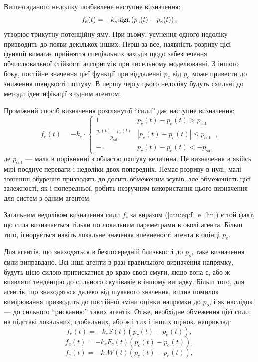 Вищезгаданого недоліку позбавлене наступне визначення:
%
\begin{equation}
  f_e(t) = - k_e \operatorname*{sign} \left( p_c(t) - p_e(t) \right) ,
  \label{atu:eq:f_e_sign}
\end{equation}
%
утворює трикутну потенційну яму. При цьому, усунення одного
недоліку призводить до появи декількох інших. Перш за все,
наявність розриву цієї функції вимагає прийняття спеціальних
заходів щодо забезпечення обчислювальної стійкості алгоритмів
при чисельному моделюванні. З іншого боку, постійне значення
цієї функції при віддаленні
$ p_c $ від
$ p_e $ може привести до зниження швидкості пошуку. В першу чергу
цього недоліку будуть схильні до методи ідентифікації з одним
агентом.

Проміжний спосіб визначення розглянутої ``сили'' дає наступне
визначення:
%
\begin{equation}
  f_e(t)
  = - k_e \cdot
  \begin{cases}
    1 &  p_c(t) - p_e(t)  > p_\mathrm{sat}
    \\
    \frac{p_c(t)-p_e(t)}{p_\mathrm{sat}} & | p_c(t)-p_e(t)| \le p_\mathrm{sat}
    \\
    -1 &  p_c(t) - p_e(t)  < -p_\mathrm{sat}
  \end{cases},
  \label{atu:eq:f_e_sat}
\end{equation}
%
де  $p_\mathrm{sat}$ ---
мала в порівнянні з областю пошуку величина. Це визначення в
якійсь мірі поєднує переваги і недоліки двох попередніх. Немає
розриву в нулі, малі зовнішні обурення призводять до досить
обмеженим зсувів, але обмеженість цієї залежності, як і
попередньої, робить незручним використання цього визначення
для систем з одним агентом.

Загальним недоліком визначення сили $f_e$ за виразом (\ref{atu:eq:f_e_lin})
є той факт, що сила визначається тільки по локальним параметрами в околі
агента. Більш того, ігнорується навіть локальне значення впевненості агента в
оцінці $p_e$.

Для агентів, що знаходяться в безпосередній близькості до
$ p_o $, таке визначення сили виправдано. Всі інші агенти в разі
правильного визначення напрямку, будуть цією силою притискатися
до краю своєї смуги, якщо вона є, або ж виявляти тенденцію до
сильного скучіваніе в іншому випадку. Більш того, для агентів,
що знаходяться далеко від шуканого значення, вплив помилок
вимірювання призводить до постійної зміни оцінки напрямки до
$ p_o $, і як наслідок --- до сильного ``рисканню'' таких агентів. Отже,
необхідне обмеження цієї сили, на підставі локальних,
глобальних, або ж і тих і інших оцінок. наприклад:
%
\begin{equation}
  f_e(t) = - k_e S(t) \left( p_c(t) - p_e(t) \right) ,
  \label{atu:eq:f_e_lin_S}
\end{equation}
%
\begin{equation}
  f_e(t) = - k_e F_c(t) \left( p_c(t) - p_e(t) \right) ,
  \label{atu:eq:f_e_lin_F}
\end{equation}
%
\begin{equation}
  f_e(t) = - k_e W(t) \left( p_c(t) - p_e(t) \right) ,
  \label{atu:eq:f_e_lin_W}
\end{equation}



